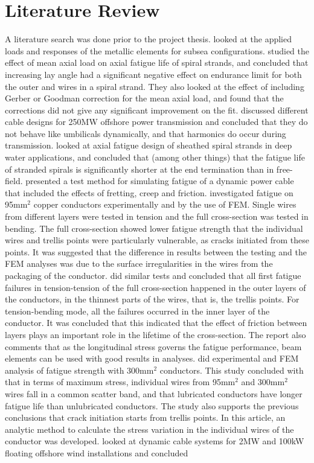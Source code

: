 \section{Literature Review}
A literature search was done prior to the project thesis. \cite{Feld1995} looked at the applied loads and responses of the metallic elements for subsea configurations. \cite{Alani1997Eoma} studied the effect of mean axial load on axial fatigue life of spiral strands, and concluded that increasing lay angle had a significant negative effect on endurance limit for both the outer and wires in a spiral strand. They also looked at the effect of including Gerber or Goodman correction for the mean axial load, and found that the corrections did not give any significant improvement on the fit.  \cite{Chien2004} discussed different cable designs for 250MW offshore power transmission and concluded that they do not behave like umbilicals dynamically, and that harmonics do occur during transmission. \cite{Raoof2008} looked at axial fatigue design of sheathed spiral strands in deep water applications, and concluded that (among other things) that the fatigue life of stranded spirals is significantly shorter at the end termination than in free-field. \cite{Karlsen2010} presented a test method for simulating fatigue of a dynamic power cable that included the effects of fretting, creep and friction. \cite{Nasution2013} investigated fatigue on 95mm$^2$ copper conductors experimentally and by the use of FEM. Single wires from different layers were tested in tension and the full cross-section was tested in bending. The full cross-section showed lower fatigue strength that the individual wires and trellis points were particularly vulnerable, as cracks initiated from these points. It was suggested that the difference in results between the testing and the FEM analyses was due to the surface irregularities in the wires from the packaging of the conductor. \cite{NASUTION2014} did similar tests and concluded that all first fatigue failures in tension-tension of the full cross-section happened in the outer layers of the conductors, in the thinnest parts of the wires, that is, the trellis points. For tension-bending mode, all the failures occurred in the inner layer of the conductor. It was concluded that this indicated that the effect of friction between layers plays an important role in the lifetime of the cross-section. The report also comments that as the longitudinal stress governs the fatigue performance, beam elements can be used with good results in analyses. \cite{s300} did experimental and FEM analysis of fatigue strength with 300mm$^2$ conductors. This study concluded with that in terms of maximum stress, individual wires from 95mm$^2$  and 300mm$^2$ wires fall in a common scatter band, and that lubricated conductors have longer fatigue life than unlubricated conductors. The study also supports the previous conclusions that crack initiation starts from trellis points. In this article, an analytic method to calculate the stress variation in the individual wires of the conductor was developed. \cite{Taninok2017} looked at dynamic cable systems for 2MW and 100kW floating offshore wind installations and concluded 